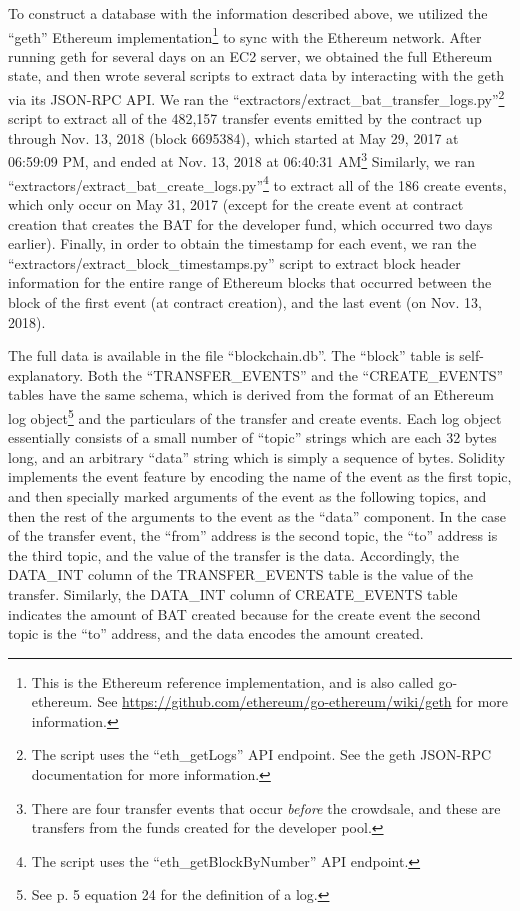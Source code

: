 \documentclass[sigconf]{acmart}
\begin{document}
To construct a database with the information described above,
we utilized the ``geth'' Ethereum implementation\footnote{This is the Ethereum reference
implementation, and is also called go-ethereum.
See \url{https://github.com/ethereum/go-ethereum/wiki/geth} for more information.}
to sync with the Ethereum network.
After running geth for several days on an EC2 server, we obtained
the full Ethereum state, and then
wrote several scripts to extract data
by interacting with the geth via its
JSON-RPC API.
We ran the ``extractors/extract\_bat\_transfer\_logs.py''\footnote{The script uses the ``eth\_getLogs'' API endpoint.
See the geth JSON-RPC documentation\cite{geth-jsonrpc} for more information.}
script to extract all of the 482,157 transfer events
emitted by the contract up through Nov. 13, 2018
(block 6695384), which started at
May 29, 2017 at 06:59:09 PM,
and ended at
Nov. 13, 2018 at 06:40:31
AM\footnote{There are four transfer events that
occur \emph{before} the crowdsale, and these
are transfers from the funds created for
the developer pool.}
Similarly, we ran ``extractors/extract\_bat\_create\_logs.py''\footnote{The script uses the ``eth\_getBlockByNumber'' API endpoint.}
to extract all of the 186 create events, which only
occur on May 31, 2017 (except for the create event at
contract creation that
creates the BAT for the developer fund,
which occurred two days earlier).
Finally, in order to obtain the timestamp for each
event, we ran the
``extractors/extract\_block\_timestamps.py''
script to extract block header information
for the entire range of Ethereum blocks
that occurred between the block of the
first event (at contract creation),
and the last event (on Nov. 13, 2018).

The full data is available in the file
``blockchain.db''. The ``block'' table
is self-explanatory. Both the ``TRANSFER\_EVENTS''
and the ``CREATE\_EVENTS'' tables have the same
schema, which is derived from the format of an
Ethereum log object\footnote{See \cite{yellowpaper} p. 5 equation 24 for the definition of a log.}
and the particulars
of the transfer and create events.
Each log object essentially consists of a small number of
``topic'' strings which are each 32 bytes long,
and an arbitrary ``data'' string which is simply
a sequence of bytes. Solidity implements the event
feature by encoding the name of the event as the 
first topic, and then specially marked arguments
of the event as the following topics, and then the 
rest of the arguments to the event as the ``data''
component. In the case of the transfer event,
the ``from'' address is the second topic,
the ``to'' address is the third topic,
and the value of the transfer is the data.
Accordingly, the DATA\_INT column of the
TRANSFER\_EVENTS table is the value of the transfer.
Similarly, the DATA\_INT column of CREATE\_EVENTS 
table indicates the amount of BAT created because
for the create event the second topic is the ``to''
address, and the data encodes the amount created.
\end{document}
